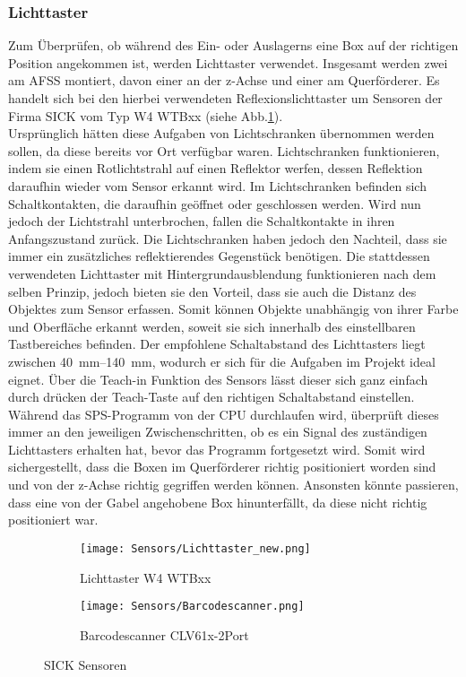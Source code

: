 \subsubsection{Lichttaster}
Zum Überprüfen, ob während des Ein- oder Auslagerns eine Box auf der richtigen Position angekommen ist, werden Lichttaster verwendet. Insgesamt werden zwei am AFSS montiert, davon einer an der z-Achse und einer am Querförderer. Es handelt sich bei den hierbei verwendeten Reflexionslichttaster um Sensoren der Firma SICK vom Typ W4 WTBxx (siehe Abb.\ref{lichttaster}).\\
Ursprünglich hätten diese Aufgaben von Lichtschranken übernommen werden sollen, da diese bereits vor Ort verfügbar waren. Lichtschranken funktionieren, indem sie einen Rotlichtstrahl auf einen Reflektor werfen, dessen Reflektion daraufhin wieder vom Sensor erkannt wird. Im Lichtschranken befinden sich Schaltkontakten, die daraufhin geöffnet oder geschlossen werden. Wird nun jedoch der Lichtstrahl unterbrochen, fallen die Schaltkontakte in ihren Anfangszustand zurück. Die Lichtschranken haben jedoch den Nachteil, dass sie immer ein zusätzliches reflektierendes Gegenstück benötigen. Die stattdessen verwendeten Lichttaster mit Hintergrundausblendung funktionieren nach dem selben Prinzip, jedoch bieten sie den Vorteil, dass sie auch die Distanz des Objektes zum Sensor erfassen. Somit können Objekte unabhängig von ihrer Farbe und Oberfläche erkannt werden, soweit sie sich innerhalb des einstellbaren Tastbereiches befinden.\cite{Lichttaster_und_Schranken} Der empfohlene Schaltabstand des Lichttasters liegt zwischen \qtyrange{40}{140}{\milli\meter}, wodurch er sich für die Aufgaben im Projekt ideal eignet. Über die Teach-in Funktion des Sensors lässt dieser sich ganz einfach durch drücken der Teach-Taste auf den richtigen Schaltabstand einstellen.\cite{Lichttaster_datasheet}\\
Während das SPS-Programm von der CPU durchlaufen wird, überprüft dieses immer an den jeweiligen Zwischenschritten, ob es ein Signal des zuständigen Lichttasters erhalten hat, bevor das Programm fortgesetzt wird. Somit wird sichergestellt, dass die Boxen im Querförderer richtig positioniert worden sind und von der z-Achse richtig gegriffen werden können. Ansonsten könnte passieren, dass eine von der Gabel angehobene Box hinunterfällt, da diese nicht richtig positioniert war.

\begin{figure}[H]
    \centering
    \begin{subfigure}{.4\textwidth}
        \centering
        \texttt{[image: Sensors/Lichttaster\_new.png]}
        \caption{Lichttaster W4 WTBxx\cite{Lichttaster_pic}}
        \label{lichttaster}
    \end{subfigure}
    \begin{subfigure}{.4\textwidth}
        \centering
        \texttt{[image: Sensors/Barcodescanner.png]}
        \caption{Barcodescanner CLV61x-2Port\cite{BarScan_pic}}
        \label{BarScan}
    \end{subfigure}
    \caption{SICK Sensoren}
\end{figure}

